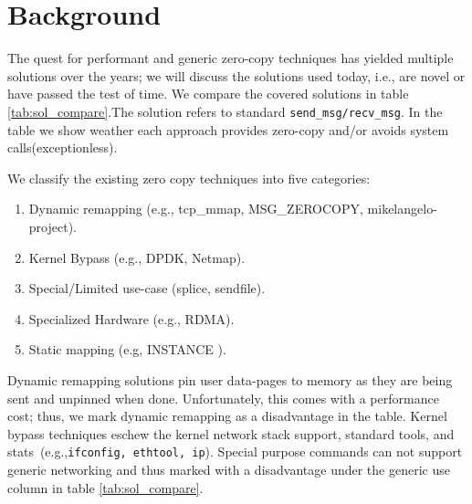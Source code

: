 \section{Background}\label{sec:background}
The quest for performant and generic zero-copy techniques has yielded multiple solutions over the years; we will discuss the solutions used today, i.e., are novel or have passed the test of time.
We compare the covered solutions in table \ref{tab:sol_compare}.The  solution refers to standard \texttt{send\_msg/recv\_msg}. In the table we show weather each approach provides zero-copy and/or avoids system calls(exceptionless).

We classify the existing zero copy techniques into five categories:
\begin{enumerate}
    \item Dynamic remapping (e.g., tcp\_mmap, MSG\_ZEROCOPY\cite{desendmsg}, mikelangelo-project\cite{mikelangelo}).
    \item Kernel Bypass (e.g., DPDK, Netmap\cite{rizzo2012netmap}).
    \item Special/Limited use-case (splice, sendfile).
    \item Specialized Hardware (e.g., RDMA).
    \item Static mapping (e.g, INSTANCE \cite{instance}).
\end{enumerate}
Dynamic remapping solutions pin user data-pages to memory as they are being sent and unpinned when done. Unfortunately, this comes with a performance cost; thus, we mark dynamic remapping as a disadvantage in the table. Kernel bypass techniques eschew the kernel network stack support, standard tools, and stats~(e.g.,\texttt{ifconfig, ethtool, ip}). Special purpose commands can not support generic networking and thus marked with a disadvantage under the generic use column in table \ref{tab:sol_compare}.




